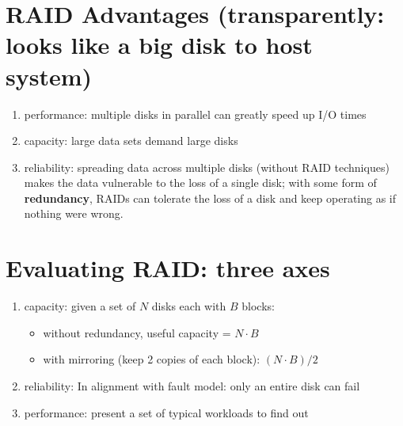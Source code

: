 \section*{RAID Advantages (transparently: looks like a big disk to host system)}
\begin{enumerate}
\item performance: multiple disks in parallel can greatly speed up I/O times
\item capacity: large data sets demand large disks
\item reliability: spreading data across multiple disks (without RAID techniques) makes the data vulnerable to the loss of a single disk; with some form of \textbf{redundancy}, RAIDs can tolerate the loss of a disk and keep operating as if nothing were wrong.
\end{enumerate}
\section*{Evaluating RAID: three axes}
\begin{enumerate}
\item capacity: given a set of $N$ disks each with $B$ blocks:
  \begin{itemize}
  \item without redundancy, useful capacity = $N\cdot B$
  \item with mirroring (keep 2 copies of each block): $(N\cdot B)/2$
  \end{itemize}
\item reliability: In alignment with fault model: only an entire disk can fail
\item performance: present a set of typical workloads to find out
\end{enumerate}
